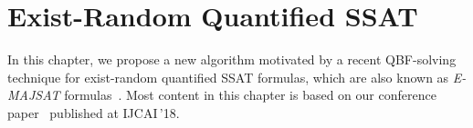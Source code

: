 \chapter{Exist-Random Quantified SSAT}
\label{chap:exist-random-ssat}

In this chapter, we propose a new algorithm motivated by a recent QBF-solving technique for exist-random quantified SSAT formulas, which are also known as \textit{E-MAJSAT} formulas~\cite{Littman1998}.
Most content in this chapter is based on our conference paper~\cite{LeeIJCAI18ERSSAT} published at IJCAI\,'18.



